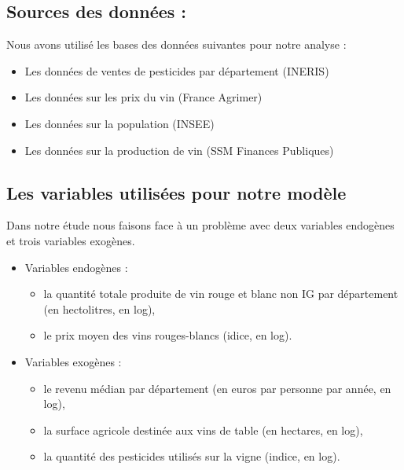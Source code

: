 \documentclass[11pt,]{article}
\providecommand{\tightlist}{%
  \setlength{\itemsep}{0pt}\setlength{\parskip}{0pt}}
\begin{document}
\FloatBarrier

\FloatBarrier

\hypertarget{sources-des-donnees}{%
\subsection{Sources des données :}\label{sources-des-donnees}}

Nous avons utilisé les bases des données suivantes pour notre analyse :

\begin{itemize}
    \item Les données de ventes de pesticides par département  (INERIS)
    \item Les données sur les prix du vin (France Agrimer)
    \item Les données sur la population (INSEE)
    \item Les données sur la production de vin (SSM Finances Publiques)
\end{itemize}
\par

\hypertarget{les-variables-utilisees-pour-notre-modele}{%
\subsection{Les variables utilisées pour notre
modèle}\label{les-variables-utilisees-pour-notre-modele}}

Dans notre étude nous faisons face à un problème avec deux variables
endogènes et trois variables exogènes.

\begin{itemize}
\tightlist
\item
  Variables endogènes :

  \begin{itemize}
  \tightlist
  \item
    la quantité totale produite de vin rouge et blanc non IG par
    département (en hectolitres, en log),
  \item
    le prix moyen des vins rouges-blancs (idice, en log).
  \end{itemize}
\item
  Variables exogènes :

  \begin{itemize}
  \tightlist
  \item
    le revenu médian par département (en euros par personne par année,
    en log),
  \item
    la surface agricole destinée aux vins de table (en hectares, en
    log),
  \item
    la quantité des pesticides utilisés sur la vigne (indice, en log).
  \end{itemize}
\end{itemize}
\end{document}

